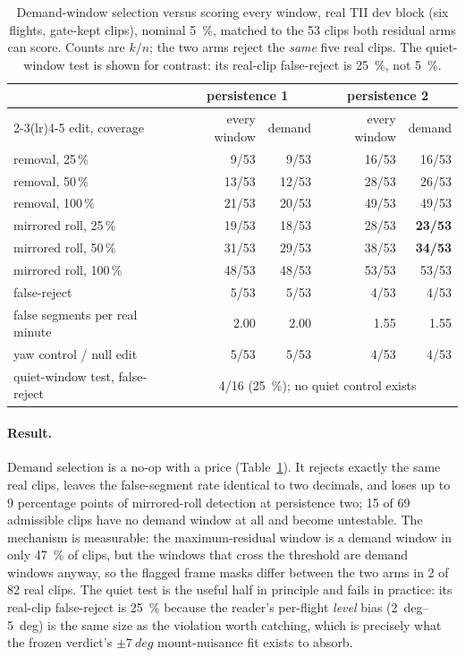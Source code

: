 \begin{table}[t]
\centering
\caption{Demand-window selection versus scoring every window, real TII dev block (six flights,
gate-kept clips), nominal \SI{5}{\percent}, matched to the 53 clips both residual arms can score.
Counts are $k/n$; the two arms reject the \emph{same} five real clips. The quiet-window test is
shown for contrast: its real-clip false-reject is \SI{25}{\percent}, not \SI{5}{\percent}.}
\label{tab:g2-demand}
\begin{tabular}{lrrrr}
\toprule
 & \multicolumn{2}{c}{persistence 1} & \multicolumn{2}{c}{persistence 2} \\
\cmidrule(lr){2-3}\cmidrule(lr){4-5}
edit, coverage & every window & demand & every window & demand \\
\midrule
removal, 25\,\% & 9/53 & 9/53 & 16/53 & 16/53 \\
removal, 50\,\% & 13/53 & 12/53 & 28/53 & 26/53 \\
removal, 100\,\% & 21/53 & 20/53 & 49/53 & 49/53 \\
mirrored roll, 25\,\% & 19/53 & 18/53 & 28/53 & \textbf{23/53} \\
mirrored roll, 50\,\% & 31/53 & 29/53 & 38/53 & \textbf{34/53} \\
mirrored roll, 100\,\% & 48/53 & 48/53 & 53/53 & 53/53 \\
\midrule
false-reject & 5/53 & 5/53 & 4/53 & 4/53 \\
false segments per real minute & 2.00 & 2.00 & 1.55 & 1.55 \\
yaw control / null edit & 5/53 & 5/53 & 4/53 & 4/53 \\
quiet-window test, false-reject & \multicolumn{4}{c}{4/16 (\SI{25}{\percent}); no quiet control exists} \\
\bottomrule
\end{tabular}
\end{table}

\paragraph{Result.} Demand selection is a no-op with a price (Table~\ref{tab:g2-demand}). It
rejects exactly the same real clips, leaves the false-segment rate identical to two decimals, and
loses up to 9 percentage points of mirrored-roll detection at persistence two; 15 of 69 admissible
clips have no demand window at all and become untestable. The mechanism is measurable: the
maximum-residual window is a demand window in only \SI{47}{\percent} of clips, but the windows
that cross the threshold are demand windows anyway, so the flagged frame masks differ between the
two arms in 2 of 82 real clips. The quiet test is the useful half in principle and fails in
practice: its real-clip false-reject is \SI{25}{\percent} because the reader's per-flight
\emph{level} bias (\SIrange{2}{5}{deg}) is the same size as the violation worth catching, which is
precisely what the frozen verdict's $\pm\SI{7}{deg}$ mount-nuisance fit exists to absorb.

